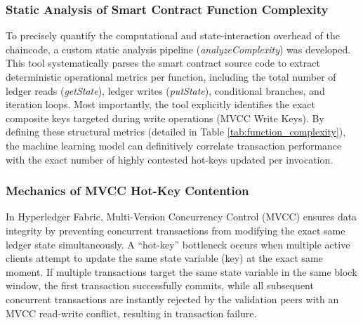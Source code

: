 \documentclass[manuscript,screen]{acmart}
\begin{document}
\subsubsection{Static Analysis of Smart Contract Function Complexity}

To precisely quantify the computational and state-interaction overhead of the chaincode, a custom static analysis pipeline (\textit{analyzeComplexity}) was developed. This tool systematically parses the smart contract source code to extract deterministic operational metrics per function, including the total number of ledger reads (\textit{getState}), ledger writes (\textit{putState}), conditional branches, and iteration loops. Most importantly, the tool explicitly identifies the exact composite keys targeted during write operations (MVCC Write Keys). By defining these structural metrics (detailed in Table \ref{tab:function_complexity}), the machine learning model can definitively correlate transaction performance with the exact number of highly contested hot-keys updated per invocation.

\begin{table}[ht]
\centering
\caption{Static Analysis of Smart Contract Function Complexity and MVCC Hot-Keys}
\label{tab:function_complexity}
\end{table}
 
  \subsubsection{Mechanics of MVCC Hot-Key Contention}
  In Hyperledger Fabric, Multi-Version Concurrency Control (MVCC) ensures data integrity by preventing concurrent transactions from modifying the exact same ledger state simultaneously. A ``hot-key'' bottleneck occurs when multiple active clients attempt to update the same state variable (key) at the exact same moment. If multiple transactions target the same state variable in the same block window, the first transaction successfully commits, while all subsequent concurrent transactions are instantly rejected by the validation peers with an MVCC read-write conflict, resulting in transaction failure.
  
\end{document}
